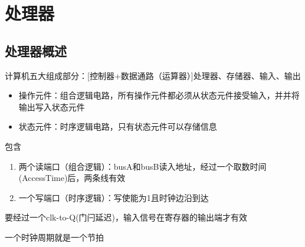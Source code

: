 
\section{处理器}
\subsection{处理器概述}
计算机五大组成部分：[控制器+数据通路（运算器）]处理器、存储器、输入、输出
\begin{itemize}
	\item 操作元件：组合逻辑电路，所有操作元件都必须从状态元件接受输入，并并将输出写入状态元件
	\item 状态元件：时序逻辑电路，只有状态元件可以存储信息
\end{itemize}
\begin{definition}
包含
\begin{enumerate}
\item 两个读端口（组合逻辑）：busA和busB读入地址，经过一个取数时间(AccessTime)后，两条线有效
\item 一个写端口（时序逻辑）：写使能为1且时钟边沿到达
\end{enumerate}
要经过一个clk-to-Q(门闩延迟)，输入信号在寄存器的输出端才有效
\end{definition}
一个时钟周期就是一个节拍



